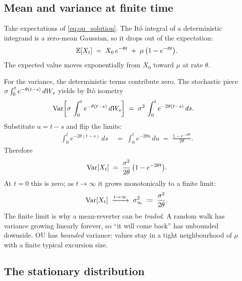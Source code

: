 \subsection{Mean and variance at finite time}
\label{subsec:ch9_meanvar}

Take expectations of \eqref{eq:ou_solution}. The It\^o integral
of a deterministic integrand is a zero-mean Gaussian, so it drops
out of the expectation:
\begin{equation}
  \mathbb{E}[X_t]
  \;=\; X_0\,e^{-\theta t} \;+\; \mu\,\bigl(1 - e^{-\theta t}\bigr).
  \label{eq:ou_mean}
\end{equation}
The expected value moves exponentially from $X_0$ toward $\mu$ at
rate $\theta$.

For the variance, the deterministic terms contribute zero. The
stochastic piece $\sigma \int_0^t e^{-\theta(t-s)}\, dW_s$ yields
by It\^o isometry
\begin{align}
  \operatorname{Var}\!\left[\sigma\,\int_0^t e^{-\theta(t-s)}\,dW_s\right]
  \;&=\; \sigma^2\,\int_0^t e^{-2\theta(t-s)}\,ds.
  \label{eq:ou_var_step1}
\end{align}
Substitute $u = t - s$ and flip the limits:
\begin{align}
  \int_0^t e^{-2\theta(t-s)}\,ds
  \;&=\; \int_0^t e^{-2\theta u}\,du
  \;=\; \frac{1 - e^{-2\theta t}}{2\theta}. \label{eq:ou_var_step2}
\end{align}
Therefore
\begin{equation}
  \operatorname{Var}[X_t] \;=\; \frac{\sigma^2}{2\theta}\,
                 \bigl(1 - e^{-2\theta t}\bigr).
  \label{eq:ou_var_finite}
\end{equation}
At $t = 0$ this is zero; as $t \to \infty$ it grows monotonically
to a finite limit:
\begin{equation}
  \operatorname{Var}[X_t] \;\xrightarrow{t \to \infty}\;
  \sigma_\infty^2 \;\coloneqq\; \frac{\sigma^2}{2\theta}.
  \label{eq:ou_var_stationary}
\end{equation}
The finite limit is why a mean-reverter can be \emph{traded}.
A random walk has variance growing linearly forever, so ``it
will come back'' has unbounded downside. OU has \emph{bounded}
variance: values stay in a tight neighbourhood of $\mu$ with
a finite typical excursion size.

\subsection{The stationary distribution}
\label{subsec:ch9_stationary}


